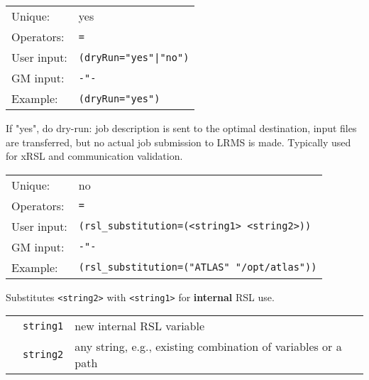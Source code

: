   \hspace*{0.5cm}
  \begin{shaded}
  \end{shaded}
  \begin{tabular}{lp{13cm}}
    Unique:&yes\\
    Operators:&\verb#=#\\
    User input:&\verb#(dryRun="yes"|"no")#\\
    GM input:&\verb#-"-#\\
    Example:&\verb#(dryRun="yes")#\\
  \end{tabular}

  If "yes", do dry-run: job description is sent to the optimal destination, input files are transferred, but no actual job submission to LRMS
  is made. Typically used for xRSL and communication validation.

  \hspace*{0.5cm}
  \begin{shaded}
  \end{shaded}
  \begin{tabular}{lp{13cm}}
    Unique:&no\\
    Operators:&\verb#=#\\
    User input:&\verb#(rsl_substitution=(<string1> <string2>))#\\
    GM input:&\verb#-"-#\\
    Example:&\verb#(rsl_substitution=("ATLAS" "/opt/atlas"))#\\
  \end{tabular}

  Substitutes \verb#<string2># with \verb#<string1># for
  \textbf{internal} RSL use.

  \begin{tabular}{llp{10cm}}
    \hspace*{1cm}&\texttt{string1} & new internal RSL variable\\
    \hspace*{1cm}&\texttt{string2} & any string, e.g., existing combination of
    variables or a path\\
  \end{tabular}
  

